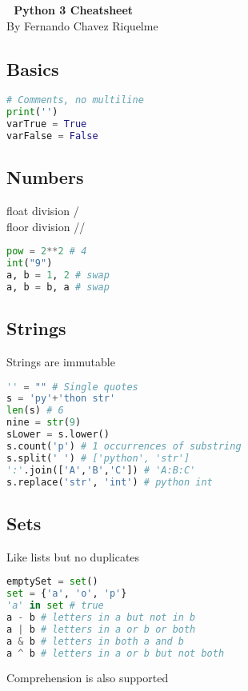 \documentclass[a4paper, 10pt]{article}
\newcommand{\mySection}[1]{
  \noindent\colorbox{shadecolor}{
    \parbox{\textwidth}{\section*{#1}}
  }
}
\begin{document}
\begin{center}{
  \huge{\textbf{ Python 3 Cheatsheet}}}
  \\{\large By Fernando Chavez Riquelme}
\end{center}

\begin{minipage}[t]{0.2\textwidth}
  \mySection{Basics}
  \begin{lstlisting}[language=Python]
# Comments, no multiline
print('')
varTrue = True
varFalse = False
  \end{lstlisting}
\end{minipage}
\hspace{5mm}
\begin{minipage}[t]{0.13\textwidth}
  \mySection{Numbers}
  float division /\\
  floor division //
  \begin{lstlisting}[language=Python]
pow = 2**2 # 4
int("9")
a, b = 1, 2 # swap
a, b = b, a # swap 
  \end{lstlisting}
\end{minipage}
\hspace{5mm}
\begin{minipage}[t]{0.26\textwidth}
  \mySection{Strings}
  Strings are immutable
  \begin{lstlisting}[language=Python]
'' = "" # Single quotes
s = 'py'+'thon str'
len(s) # 6
nine = str(9)
sLower = s.lower()
s.count('p') # 1 occurrences of substring
s.split(' ') # ['python', 'str']
':'.join(['A','B','C']) # 'A:B:C'
s.replace('str', 'int') # python int
  \end{lstlisting}
\end{minipage}
\par
\begin{minipage}[t]{0.33\textwidth}
  \mySection{Sets}
  Like lists but no duplicates
  \begin{lstlisting}[language=Python]
emptySet = set()
set = {'a', 'o', 'p'}
'a' in set # true
a - b # letters in a but not in b
a | b # letters in a or b or both
a & b # letters in both a and b
a ^ b # letters in a or b but not both
  \end{lstlisting}
  Comprehension is also supported
\end{minipage}
\end{document}
